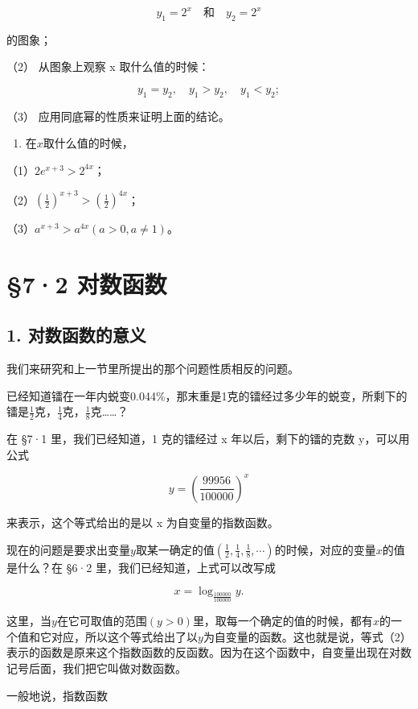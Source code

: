 \[
y_{1} = 2^{x} \quad \text{和} \quad y_{2} = 2^{x}
\]

的图象；

（2） 从图象上观察 x 取什么值的时候：

\[
y_{1} = y_{2}, \quad y_{1} > y_{2}, \quad y_{1} < y_{2};
\]

（3） 应用同底幂的性质来证明上面的结论。

\begin{enumerate}[start=2]
\item
  在\(x\)取什么值的时候，
\end{enumerate}

（1）\(2e^{x + 3} > 2^{4x}\)；

（2）\(\left(\frac{1}{2}\right)^{x + 3} > \left(\frac{1}{2}\right)^{4x}\)；

（3）\(a^{x + 3} > a^{4x} (a > 0, a \neq 1)\)。

\section{§7·2 对数函数}

\subsection{1. 对数函数的意义}

我们来研究和上一节里所提出的那个问题性质相反的问题。

已经知道镭在一年内蜕变0.044\%，那末重是1克的镭经过多少年的蜕变，所剩下的镭是\(\frac{1}{2}\)克，\(\frac{1}{4}\)克，\(\frac{1}{8}\)克\ldots\ldots？

在 §7·1 里，我们已经知道，1 克的镭经过 x 年以后，剩下的镭的克数
y，可以用公式

\[
y = \left(\frac{99956}{100000}\right)^{x} \tag {1}
\]

来表示，这个等式给出的是以 x 为自变量的指数函数。

现在的问题是要求出变量\(y\)取某一确定的值\(\left(\frac{1}{2}, \frac{1}{4}, \frac{1}{8}, \cdots\right)\)的时候，对应的变量\(x\)的值是什么？在
§6·2 里，我们已经知道，上式可以改写成

\[
x = \log_{\frac{100000}{100000}} y. \tag {2}
\]

这里，当\(y\)在它可取值的范围\((y > 0)\)里，取每一个确定的值的时候，都有\(x\)的一个值和它对应，所以这个等式给出了以\(y\)为自变量的函数。这也就是说，等式（2）表示的函数是原来这个指数函数的反函数。因为在这个函数中，自变量出现在对数记号后面，我们把它叫做对数函数。

一般地说，指数函数

